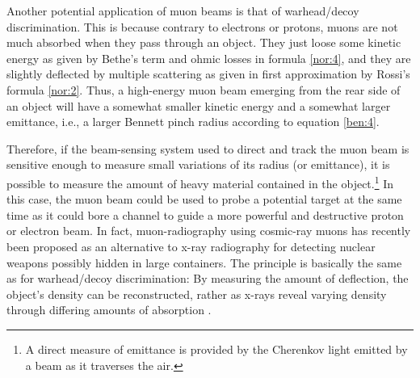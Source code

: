 \documentclass [12pt,a4paper,     ]{report} %
\begin{document}
   Another potential application of muon beams is that of warhead/decoy discrimination.  This is because contrary to electrons or protons, muons are not much absorbed when they pass through an object. They just loose some kinetic energy as given by Bethe's term and ohmic losses in formula \eqref{nor:4}, and they are slightly deflected by multiple scattering as given in first approximation by Rossi's formula \eqref{nor:2}.  Thus, a high-energy muon beam emerging from the rear side of an object will have a somewhat smaller kinetic energy and a somewhat larger emittance, i.e., a larger Bennett pinch radius according to equation \eqref{ben:4}.

   Therefore, if the beam-sensing system used to direct and track the muon beam is sensitive enough to measure small variations of its radius (or emittance), it is possible to measure the amount of heavy material contained in the object.\footnote{A direct measure of emittance is provided by the Cherenkov light emitted by a beam as it traverses the air.}  In this case, the muon beam could be used to probe a potential target at the same time as it could bore a channel to guide a more powerful and destructive proton or electron beam.  In fact, muon-radiography using cosmic-ray muons has recently been proposed as an alternative to x-ray radiography for detecting nuclear weapons possibly hidden in large containers. The principle is basically the same as for warhead/decoy discrimination: By measuring the amount of deflection, the object's density can be reconstructed, rather as x-rays reveal varying density through differing amounts of absorption \cite{BOROZ2003-}.
\end{document}
